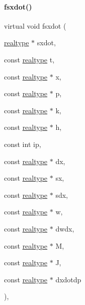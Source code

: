 \paragraph{\texorpdfstring{fsxdot()}{fsxdot()}\hspace{0.1cm}{\footnotesize\ttfamily [2/2]}}
{\footnotesize\ttfamily virtual void fsxdot (\begin{DoxyParamCaption}\item[{\mbox{\hyperlink{namespaceamici_a1bdce28051d6a53868f7ccbf5f2c14a3}{realtype}} $\ast$}]{sxdot,  }\item[{const \mbox{\hyperlink{namespaceamici_a1bdce28051d6a53868f7ccbf5f2c14a3}{realtype}}}]{t,  }\item[{const \mbox{\hyperlink{namespaceamici_a1bdce28051d6a53868f7ccbf5f2c14a3}{realtype}} $\ast$}]{x,  }\item[{const \mbox{\hyperlink{namespaceamici_a1bdce28051d6a53868f7ccbf5f2c14a3}{realtype}} $\ast$}]{p,  }\item[{const \mbox{\hyperlink{namespaceamici_a1bdce28051d6a53868f7ccbf5f2c14a3}{realtype}} $\ast$}]{k,  }\item[{const \mbox{\hyperlink{namespaceamici_a1bdce28051d6a53868f7ccbf5f2c14a3}{realtype}} $\ast$}]{h,  }\item[{const int}]{ip,  }\item[{const \mbox{\hyperlink{namespaceamici_a1bdce28051d6a53868f7ccbf5f2c14a3}{realtype}} $\ast$}]{dx,  }\item[{const \mbox{\hyperlink{namespaceamici_a1bdce28051d6a53868f7ccbf5f2c14a3}{realtype}} $\ast$}]{sx,  }\item[{const \mbox{\hyperlink{namespaceamici_a1bdce28051d6a53868f7ccbf5f2c14a3}{realtype}} $\ast$}]{sdx,  }\item[{const \mbox{\hyperlink{namespaceamici_a1bdce28051d6a53868f7ccbf5f2c14a3}{realtype}} $\ast$}]{w,  }\item[{const \mbox{\hyperlink{namespaceamici_a1bdce28051d6a53868f7ccbf5f2c14a3}{realtype}} $\ast$}]{dwdx,  }\item[{const \mbox{\hyperlink{namespaceamici_a1bdce28051d6a53868f7ccbf5f2c14a3}{realtype}} $\ast$}]{M,  }\item[{const \mbox{\hyperlink{namespaceamici_a1bdce28051d6a53868f7ccbf5f2c14a3}{realtype}} $\ast$}]{J,  }\item[{const \mbox{\hyperlink{namespaceamici_a1bdce28051d6a53868f7ccbf5f2c14a3}{realtype}} $\ast$}]{dxdotdp }\end{DoxyParamCaption})\hspace{0.3cm}{\ttfamily [protected]}, {\ttfamily [virtual]}}

